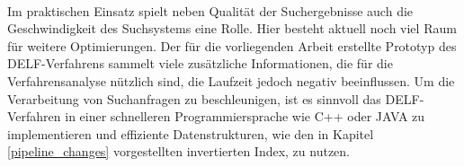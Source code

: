 \\
Im praktischen Einsatz spielt neben Qualität der Suchergebnisse auch die Geschwindigkeit des Suchsystems eine Rolle. Hier besteht aktuell noch viel Raum für weitere Optimierungen. Der für die vorliegenden Arbeit erstellte Prototyp des DELF-Verfahrens sammelt viele zusätzliche Informationen, die für die Verfahrensanalyse nützlich sind, die Laufzeit jedoch negativ beeinflussen. Um die Verarbeitung von Suchanfragen zu beschleunigen, ist es sinnvoll das DELF-Verfahren in einer schnelleren Programmiersprache wie C++ oder JAVA zu implementieren und effiziente Datenstrukturen, wie den in Kapitel \ref{pipeline_changes} vorgestellten invertierten Index, zu nutzen.
